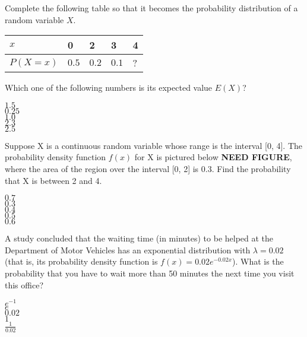 \documentclass[12pt]{amsart}
\begin{document}
\begin{exam}
\begin{problem}
Complete the following table so that it
becomes the probability distribution 
of a random variable $X$.

\begin{center}
\begin{tabular}{|l|l|l|l|l|}
\hline
$x$ & 0 & 2 & 3 & 4 \\
\hline
$P(X = x)$ & $0.5$ & $0.2$ & $0.1$ &? \\
\hline
\end{tabular}
\end{center}
Which one of the following numbers is its expected value $E(X)$?
%
\begin{answers}{1}
$1.5$ \\
$0.25$\\
$1.0$ \\
$2.3$ \\
$2.5$ \\
\end{answers}
\end{problem}









\begin{problem}
Suppose X is a continuous random variable whose range is the interval
\phantom{sp} [0, 4].
The probability density function $f(x)$ for X is pictured below \textbf{NEED
FIGURE}, where the area of the region over the interval [0, 2] is 0.3. Find the
probability that X is between 2 and 4.
\begin{answers}{1}
$0.7$\\
$0.3$\\
$0.4$\\
$0.5$\\
$0.6$\\
\end{answers}
\end{problem}


\begin{problem}
 A study concluded that the waiting time (in minutes) to be helped at
the Department of Motor Vehicles has an exponential distribution with
$\lambda=0.02$ (that is, its probability density function is $f(x)=0.02
e^{-0.02x}$). What is the probability that you have to wait more than 50 minutes
the next time you visit this office? 
%
\begin{answers}{1}
$e^{-1}$ \\
$e$ \\
$0.02$ \\
$1$ \\
$\frac{1}{0.02}$ \\
\end{answers}
%
\end{problem}




\end{exam}
\end{document}
